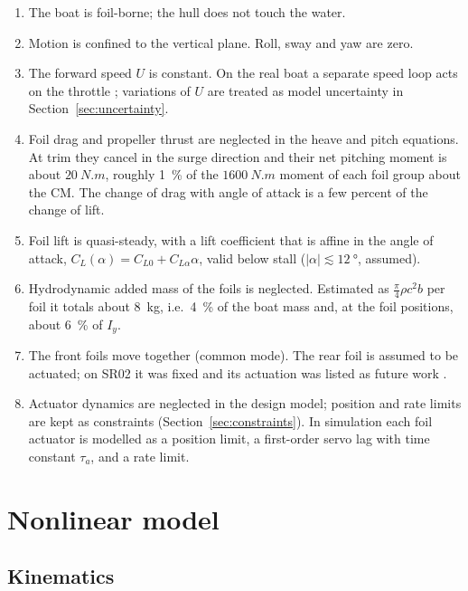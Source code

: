 \documentclass[11pt,a4paper]{article}
\begin{document}
\begin{enumerate}[label=A\arabic*.,leftmargin=2.6em]
\item The boat is foil-borne; the hull does not touch the water.
\item Motion is confined to the vertical plane. Roll, sway and yaw are zero.
\item The forward speed $U$ is constant. On the real boat a separate speed loop
      acts on the throttle \cite{belime}; variations of $U$ are treated as model
      uncertainty in Section~\ref{sec:uncertainty}.
\item Foil drag and propeller thrust are neglected in the heave and pitch
      equations. At trim they cancel in the surge direction and their net pitching
      moment is about $\SI{20}{N.m}$, roughly \SI{1}{\percent} of the
      $\SI{1600}{N.m}$ moment of each foil group about the CM. The change of
      drag with angle of attack is a few percent of the change of lift.
\item Foil lift is quasi-steady, with a lift coefficient that is affine in the
      angle of attack, $C_L(\alpha)=C_{L0}+C_{L\alpha}\alpha$, valid below stall
      ($|\alpha|\lesssim\SI{12}{\degree}$, assumed).
\item Hydrodynamic added mass of the foils is neglected. Estimated as
      $\tfrac{\pi}{4}\rho c^2 b$ per foil it totals about \SI{8}{kg}, i.e.\
      \SI{4}{\percent} of the boat mass and, at the foil positions, about
      \SI{6}{\percent} of $I_y$.
\item The front foils move together (common mode). The rear foil is assumed to be
      actuated; on SR02 it was fixed and its actuation was listed as future work
      \cite{belime}.
\item Actuator dynamics are neglected in the design model; position and rate
      limits are kept as constraints (Section~\ref{sec:constraints}). In
      simulation each foil actuator is modelled as a position limit, a
      first-order servo lag with time constant $\tau_a$, and a rate limit.
\end{enumerate}

\section{Nonlinear model}
\label{sec:nlmodel}

\subsection{Kinematics}
\end{document}

